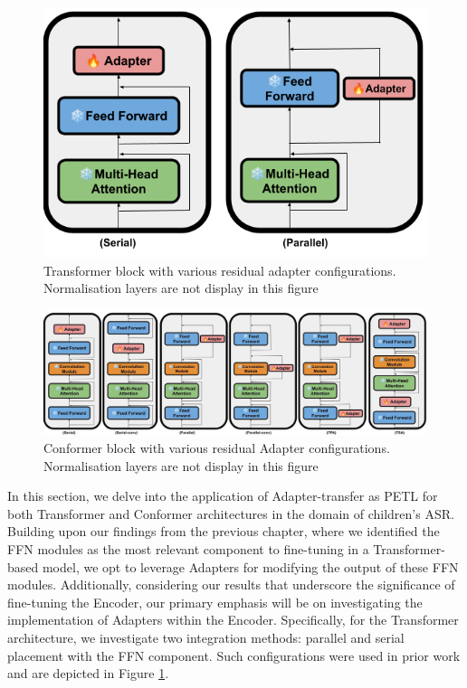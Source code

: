 \begin{figure}[t]
    \begin{center}
    \includegraphics[scale=0.27]{imgs/Adapter_Transformer.png}
    \caption{Transformer block with various residual adapter configurations. Normalisation layers are not display in this figure}
    \label{fig:transformer_config}
    \end{center}
\end{figure}
\begin{figure}[t]
    \begin{center}
    \includegraphics[scale=0.27]{imgs/Adapter_conformer.png}
    \caption{Conformer block with various residual Adapter configurations. Normalisation layers are not display in this figure}
    \label{fig:conformer_config}
    \end{center}
\end{figure}

In this section, we delve into the application of Adapter-transfer as \ac{PETL} for both Transformer and Conformer architectures in the domain of children's \ac{ASR}. Building upon our findings from the previous chapter, where we identified the \ac{FFN} modules as the most relevant component to fine-tuning in a Transformer-based model, we opt to leverage Adapters for modifying the output of these \ac{FFN} modules. Additionally, considering our results that underscore the significance of fine-tuning the Encoder, our primary emphasis will be on investigating the implementation of Adapters within the Encoder. Specifically, for the Transformer architecture, we investigate two integration methods: parallel and serial placement with the \ac{FFN} component. Such configurations were used in prior work \cite{he2022towards} and are depicted in Figure \ref{fig:transformer_config}.

